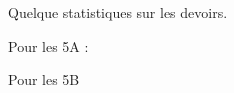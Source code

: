 
Quelque statistiques sur les devoirs.

\vfill

Pour les 5A :


\begin{center}
   
\end{center}

\vfill

Pour les 5B

\begin{center}
   
\end{center}

